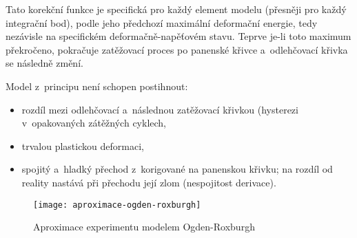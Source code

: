 Tato korekční funkce je specifická pro každý element modelu (přesněji pro každý integrační bod), podle jeho předchozí maximální deformační energie, tedy nezávisle na specifickém deformačně-napěťovém stavu.
Teprve je-li toto maximum překročeno, pokračuje zatěžovací proces po panenské křivce a~odlehčovací křivka se následně změní.

Model z~principu není schopen postihnout:
\begin{itemize}
	\item rozdíl mezi odlehčovací a~následnou zatěžovací křivkou (hysterezi v~opakovaných zátěžných cyklech,
	\item trvalou plastickou deformaci,
	\item spojitý a~hladký přechod z~korigované na panenskou křivku; na rozdíl od reality nastává při přechodu její zlom (nespojitost derivace).
\end{itemize}

\begin{figure}[H]
	\centering
	\texttt{[image: aproximace-ogden-roxburgh]}
	\caption{Aproximace experimentu modelem Ogden-Roxburgh}
	\label{fig:aproximace-ogden-roxburgh}
\end{figure}
